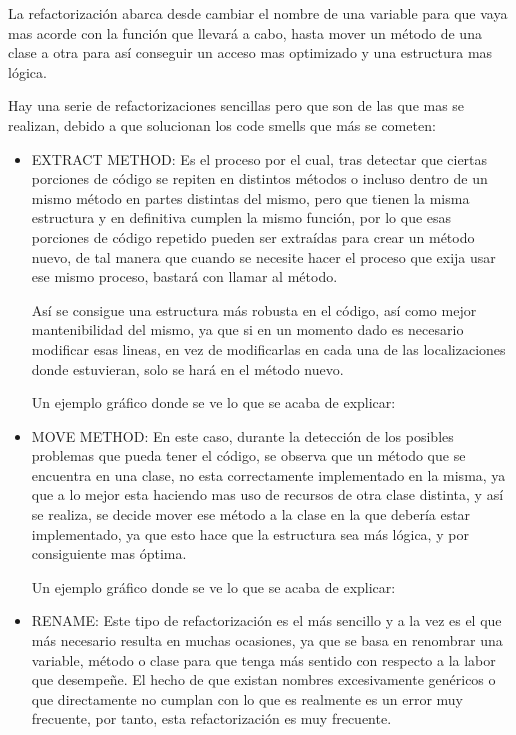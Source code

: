 La refactorización abarca desde cambiar el nombre de una variable para que vaya mas acorde con la función que llevará a cabo, hasta mover un método de una clase a otra para así conseguir un acceso mas optimizado y una estructura mas lógica.

Hay una serie de refactorizaciones sencillas pero que son de las que mas se realizan, debido a que solucionan los code smells que más se cometen:

\begin{itemize}
\item EXTRACT METHOD: Es el proceso por el cual, tras detectar que ciertas porciones de código se repiten en distintos métodos o incluso dentro de un mismo método en partes distintas del mismo, pero que tienen la misma estructura y en definitiva cumplen la mismo función, por lo que esas porciones de código repetido pueden ser extraídas para crear un método nuevo, de tal manera que cuando se necesite hacer el proceso que exija usar ese mismo proceso, bastará con llamar al método. 

Así se consigue una estructura más robusta en el código, así como mejor mantenibilidad del mismo, ya que si en un momento dado es necesario modificar esas lineas, en vez de modificarlas en cada una de las localizaciones donde estuvieran, solo se hará en el método nuevo.

Un ejemplo gráfico donde se ve lo que se acaba de explicar:




\item MOVE METHOD: En este caso, durante la detección de los posibles problemas que pueda tener el código, se observa que un método que se encuentra en una clase, no esta correctamente implementado en la misma, ya que a lo mejor esta haciendo mas uso de recursos de otra clase distinta, y así se realiza, se decide mover ese método a la clase en la que debería estar implementado, ya que esto hace que la estructura sea más lógica, y por consiguiente mas óptima.

Un ejemplo gráfico donde se ve lo que se acaba de explicar:


\item RENAME: Este tipo de refactorización es el más sencillo y a la vez es el que más necesario resulta en muchas ocasiones, ya que se basa en renombrar una variable, método o clase para que tenga más sentido con respecto a la labor que desempeñe. El hecho de que existan nombres excesivamente genéricos o que directamente no cumplan con lo que es realmente es un error muy frecuente, por tanto, esta refactorización es muy frecuente.
\end{itemize}

